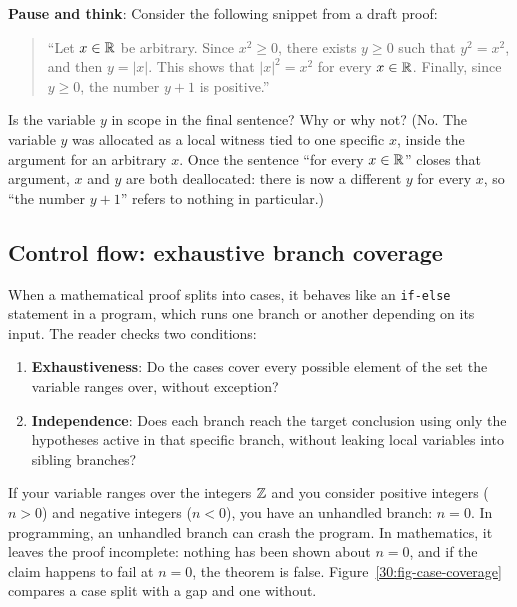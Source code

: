 \begin{recoverybox}
\textbf{Pause and think}: Consider the following snippet from a draft proof:
\begin{quote}
``Let $x \in \mathbb{R}$ be arbitrary. Since $x^2 \ge 0$, there exists $y \ge 0$ such that $y^2 = x^2$, and then $y = |x|$. This shows that $|x|^2 = x^2$ for every $x \in \mathbb{R}$. Finally, since $y \ge 0$, the number $y + 1$ is positive.''
\end{quote}
Is the variable $y$ in scope in the final sentence? Why or why not? (No. The variable $y$ was allocated as a local witness tied to one specific $x$, inside the argument for an arbitrary $x$. Once the sentence ``for every $x \in \mathbb{R}$'' closes that argument, $x$ and $y$ are both deallocated: there is now a different $y$ for every $x$, so ``the number $y + 1$'' refers to nothing in particular.)
\end{recoverybox}

\subsection{Control flow: exhaustive branch coverage}

When a mathematical proof splits into cases, it behaves like an \texttt{if-else} statement in a program, which runs one branch or another depending on its input. The reader checks two conditions:
\begin{enumerate}
\item \textbf{Exhaustiveness}: Do the cases cover every possible element of the set the variable ranges over, without exception?
\item \textbf{Independence}: Does each branch reach the target conclusion using only the hypotheses active in that specific branch, without leaking local variables into sibling branches?
\end{enumerate}

If your variable ranges over the integers $\mathbb{Z}$ and you consider positive integers ($n > 0$) and negative integers ($n < 0$), you have an unhandled branch: $n = 0$. In programming, an unhandled branch can crash the program. In mathematics, it leaves the proof incomplete: nothing has been shown about $n = 0$, and if the claim happens to fail at $n = 0$, the theorem is false. Figure~\ref{30:fig-case-coverage} compares a case split with a gap and one without.

